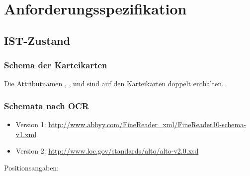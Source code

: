 

\usepackage{caption}
\usepackage{subcaption}



\sloppy  %



\newpage
\tableofcontents
\newpage


\section{Anforderungsspezifikation}


\subsection{IST-Zustand}


\subsubsection{Schema der Karteikarten}

{\small }

\vspace*{-0.3cm}
{\small }

Die Attributnamen , ,  und  sind auf den Karteikarten doppelt enthalten.

\bigskip

\subsubsection{Schemata nach OCR}

\begin{itemize}
\item Version 1:
\url{http://www.abbyy.com/FineReader_xml/FineReader10-schema-v1.xml}

\item Version 2:
\url{http://www.loc.gov/standards/alto/alto-v2.0.xsd}
\end{itemize}

Positionsangaben:







